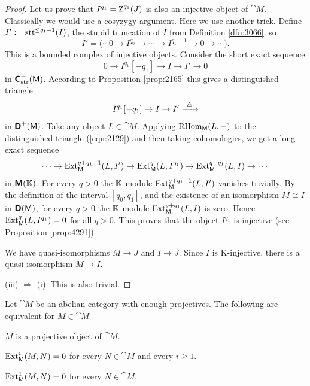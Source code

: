 \begin{proof}
Let us prove that $I^{q_1} = \operatorname{Z}^{q_1}(J)$ is also an injective object of 
$\cat{M}$. Classically we would use a cosyzygy argument. Here we use another 
trick. Define $I' := \operatorname{stt}^{\leq q_1 - 1}(I)$, 
the stupid truncation of $I$ from Definition \ref{dfn:3066}. so
\[ I' = \bigl( \cdots 0 \to I^{q_0} \to \cdots \to I^{q_1 - 1} \to 0 \to 
\cdots \bigr) . \]
This is a bounded complex of injective objects.
Consider the short exact sequence 
\[ 0 \to I^{q_1}[-q_1] \to I \to I' \to 0 \]
in $\boldsymbol{\mathsf{C}}^+_{\mathrm{str}}(\operatorname{\mathsf{M}})$.   
According to Proposition \ref{prop:2165} this gives a distinguished triangle 
\begin{equation} \label{eqn:2129}
I^{q_1}[-q_1] \to I \to I' \xrightarrow{ \ \triangle \ }  
\end{equation}
in $\boldsymbol{\mathsf{D}}^+(\operatorname{\mathsf{M}})$. Take any object $L \in \cat{M}$. Applying 
$\operatorname{RHom}_{\operatorname{\mathsf{M}}}(L, -)$ to the distinguished triangle (\ref{eqn:2129}) and 
then taking cohomologies, we get a long exact sequence
\[ \cdots \to \operatorname{Ext}_{\operatorname{\mathsf{M}}}^{q + q_1 - 1}(L, I') \to 
\operatorname{Ext}_{\operatorname{\mathsf{M}}}^{q}(L, I^{q_1}) \to 
\operatorname{Ext}_{\operatorname{\mathsf{M}}}^{q + q_1}(L, I) \to \cdots \]
in $\boldsymbol{\mathsf{M}}(\mathbb{K})$. For every $q > 0$ the $\mathbb{K}$-module 
$\operatorname{Ext}_{\operatorname{\mathsf{M}}}^{q + q_1 - 1}(L, I')$ 
vanishes trivially. By the definition of the interval $[q_0, q_1]$, and the 
existence of an isomorphism $M \cong I$ in $\boldsymbol{\mathsf{D}}(\operatorname{\mathsf{M}})$, for every 
$q > 0$ the $\mathbb{K}$-module $\operatorname{Ext}_{\operatorname{\mathsf{M}}}^{q + q_1}(L, I)$ is zero. Hence 
$\operatorname{Ext}_{\operatorname{\mathsf{M}}}^{q}(L, I^{q_1}) = 0$ for all $q > 0$. 
This proves that the object $I^{q_1}$ is injective (see Proposition 
\ref{prop:4291}). 

We have quasi-isomorphisms $M \to J$ and $I \to J$. Since $I$ is 
K-injective, there is a quasi-isomorphism $M \to I$. 

\medskip \noindent 
(iii) $\Rightarrow$ (i): This is also trivial.
\end{proof}

\begin{prop} \label{prop:4293} 
Let $\cat{M}$ be an abelian category with enough projectives. The following are 
equivalent for $M \in \cat{M}$~\tup{:}
\begin{enumerate} [itemsep=0.3ex]
 $M$ is a projective object of $\cat{M}$.

 $\operatorname{Ext}^i_{\operatorname{\mathsf{M}}}(M, N) = 0$ for every 
$N \in \cat{M}$ and every $i \geq 1$. 

  $\operatorname{Ext}^1_{\operatorname{\mathsf{M}}}(M, N) = 0$ for every 
$N \in \cat{M}$. 
\end{enumerate}
\end{prop}

